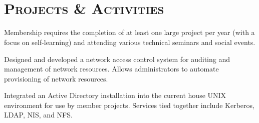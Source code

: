 \begin{resume}
\begin{formatb}
  \\
  \body\\
\end{formatb}

\section{\textsc{Projects \& Activities}}

\begin{position}
Membership requires the completion of at least one large project per year (with a focus on self-learning) and attending various technical seminars and social events.
\end{position}

\begin{position}
Designed and developed a network access control system for auditing and management of network resources. Allows administrators to automate provisioning of network resources.
\end{position}

\begin{position}
Integrated an Active Directory installation into the current house UNIX environment for use by member projects. Services tied together include Kerberos, LDAP, NIS, and NFS. 
\end{position}



\end{resume}
